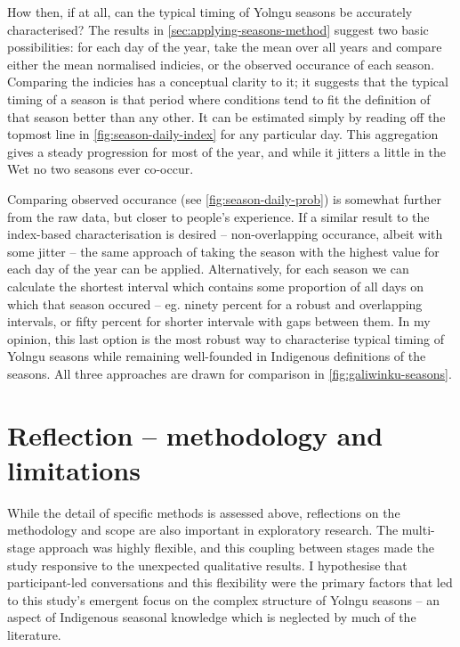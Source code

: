 How then, if at all, can the typical timing of Yolngu seasons be accurately
characterised?  The results in \cref{sec:applying-seasons-method} suggest two
basic possibilities: for each day of the year, take the mean over all years
and compare either the mean normalised indicies, or the observed occurance
of each season.
%
Comparing the indicies has a conceptual clarity to it; it suggests that the
typical timing of a season is that period where conditions tend to fit the
definition of that season better than any other.  It can be estimated simply
by reading off the topmost line in \cref{fig:season-daily-index} for any
particular day.  This aggregation gives a steady progression for most of the
year, and while it jitters a little in the Wet no two seasons ever co-occur.

Comparing observed occurance (see \cref{fig:season-daily-prob}) is somewhat
further from the raw data, but closer to people's experience.  If a similar
result to the index-based characterisation is desired -- non-overlapping
occurance, albeit with some jitter -- the same approach of taking the season
with the highest value for each day of the year can be applied.
%
Alternatively, for each season we can calculate the shortest interval which
contains some proportion of all days on which that season occured -- eg.
ninety percent for a robust and overlapping intervals, or fifty percent for
shorter intervale with gaps between them.  In my opinion, this last option
is the most robust way to characterise typical timing of Yolngu seasons while
remaining well-founded in Indigenous definitions of the seasons.
%
All three approaches are drawn for comparison in \cref{fig:galiwinku-seasons}.




\section{Reflection -- methodology and limitations}
\label{sec:disc-reflection}

While the detail of specific methods is assessed above, reflections on the
methodology and scope are also important in exploratory research.  The
multi-stage approach was highly flexible, and this coupling between stages
made the study responsive to the unexpected qualitative results.  I hypothesise
that participant-led conversations and this flexibility were the primary
factors that led to this study's emergent focus on the complex structure of
Yolngu seasons -- an aspect of Indigenous seasonal knowledge which is neglected
by much of the literature.


